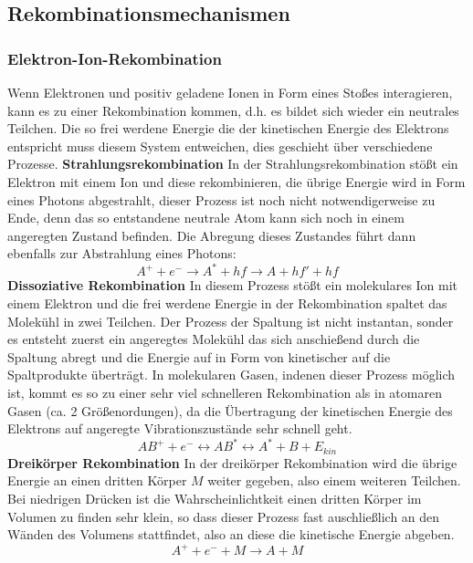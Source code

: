 \subsection{Rekombinationsmechanismen}
\subsubsection{Elektron-Ion-Rekombination}
Wenn Elektronen und positiv geladene Ionen in Form eines Stoßes interagieren, kann es zu einer Rekombination kommen, d.h. es bildet sich wieder ein neutrales Teilchen. Die so frei werdene Energie die der kinetischen Energie des Elektrons entspricht muss diesem System entweichen, dies geschieht über verschiedene Prozesse.\newline\newline
\textbf{Strahlungsrekombination}
In der Strahlungsrekombination stößt ein Elektron mit einem Ion und diese rekombinieren, die übrige Energie wird in Form eines Photons abgestrahlt, dieser Prozess ist noch nicht notwendigerweise zu Ende, denn das so entstandene neutrale Atom kann sich noch in einem angeregten Zustand befinden. Die Abregung dieses Zustandes führt dann ebenfalls zur Abstrahlung eines Photons:
\begin{equation}
    A^+ + e^- \rightarrow A^* + hf \rightarrow A + hf' + hf
    \label{eq:radiationrecombination}
\end{equation}\newline
\textbf{Dissoziative Rekombination}
In diesem Prozess stößt ein molekulares Ion mit einem Elektron und die frei werdene Energie in der Rekombination spaltet das Molekühl in zwei Teilchen. Der Prozess der Spaltung ist nicht instantan, sonder es entsteht zuerst ein angeregtes Molekühl das sich anschießend durch die Spaltung abregt und die Energie auf in Form von kinetischer auf die Spaltprodukte überträgt. In molekularen Gasen, indenen dieser Prozess möglich ist, kommt es so zu einer sehr viel schnelleren Rekombination als in atomaren Gasen (ca. 2 Größenordungen), da die Übertragung der kinetischen Energie des Elektrons auf angeregte Vibrationszustände sehr schnell geht.
\begin{equation}
    AB^+ + e^- \leftrightarrow AB^* \leftrightarrow A^* + B + E_{kin}
\end{equation}\newline
\textbf{Dreikörper Rekombination}
In der dreikörper Rekombination wird die übrige Energie an einen dritten Körper \(M\) weiter gegeben, also einem weiteren Teilchen. Bei niedrigen Drücken ist die Wahrscheinlichtkeit einen dritten Körper im Volumen zu finden sehr klein, so dass dieser Prozess fast auschließlich an den Wänden des Volumens stattfindet, also an diese die kinetische Energie abgeben.
\begin{equation}
    A^+ + e^- + M \rightarrow A + M
\end{equation}

